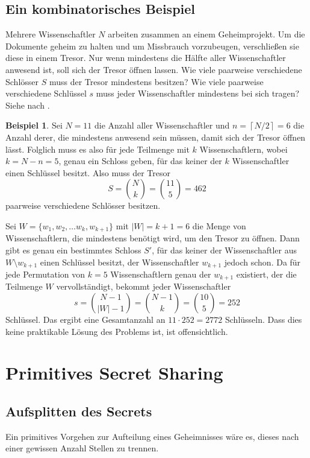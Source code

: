 \documentclass[12pt, a4paper, oneside, titlepage]{report}
\theoremstyle{definition}
\newtheorem{bsp}[lemma]{Beispiel}
\begin{document}
	\subsection{Ein kombinatorisches Beispiel}
	
	Mehrere Wissenschaftler $ N $ arbeiten zusammen an einem Geheimprojekt. Um die Dokumente geheim zu halten und um Missbrauch vorzubeugen, verschließen sie diese in einem Tresor. Nur wenn mindestens die Hälfte aller Wissenschaftler anwesend ist, soll sich der Tresor öffnen lassen. Wie viele paarweise verschiedene Schlösser $ S $ muss der Tresor mindestens besitzen? Wie viele paarweise verschiedene Schlüssel $ s $ muss jeder Wissenschaftler mindestens bei sich tragen? Siehe \cite{shamir} nach \cite{liu}.
	
	\begin{bsp}
		Sei $ N = 11 $ die Anzahl aller Wissenschaftler und $ n = \left\lceil N / 2 \right\rceil = 6 $ die Anzahl derer, die mindestens anwesend sein müssen, damit sich der Tresor öffnen lässt. Folglich muss es also für jede Teilmenge mit $ k $ Wissenschaftlern, wobei $ k = N - n = 5 $, genau ein Schloss geben, für das keiner der $ k $ Wissenschaftler einen Schlüssel besitzt. Also muss der Tresor $$ S = \binom{N}{k} = \binom{11}{5} = 462 $$ paarweise verschiedene Schlösser besitzen.
		
		Sei $ W = \{w_1, w_2, \dots w_k, w_{k+1}\} $ mit $ |W| = k + 1 = 6 $ die Menge von Wissenschaftlern, die mindestens benötigt wird, um den Tresor zu öffnen. Dann gibt es genau ein bestimmtes Schloss $ S' $, für das keiner der Wissenschaftler aus $ W \setminus w_{k+1} $ einen Schlüssel besitzt, der Wissenschaftler $ w_{k+1} $ jedoch schon. Da für jede Permutation von $ k = 5 $ Wissenschaftlern genau der $ w_{k+1} $ existiert, der die Teilmenge $ W $ \glqq vervollständigt\grqq, bekommt jeder Wissenschaftler $$ s = \binom{N-1}{|W|-1} = \binom{N-1}{k} = \binom{10}{5} = 252 $$ Schlüssel. Das ergibt eine Gesamtanzahl an $ 11 \cdot 252 = 2772 $ Schlüsseln. Dass dies keine praktikable Lösung des Problems ist, ist offensichtlich.
	\end{bsp}
	\section{Primitives Secret Sharing}
	\subsection{Aufsplitten des Secrets}
		Ein primitives Vorgehen zur Aufteilung eines Geheimnisses wäre es, dieses nach einer gewissen Anzahl Stellen zu trennen.
		
\end{document}
